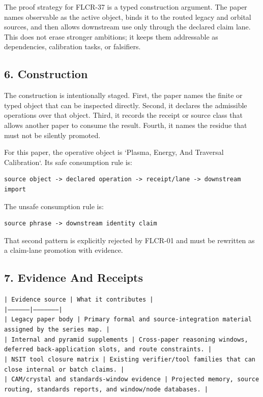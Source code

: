 \documentclass[11pt]{article}
\begin{document}
The proof strategy for FLCR-37 is a typed construction argument. The paper names observable as the active object, binds it to the routed legacy and orbital sources, and then allows downstream use only through the declared claim lane. This does not erase stronger ambitions; it keeps them addressable as dependencies, calibration tasks, or falsifiers.

\subsection*{6. Construction}

The construction is intentionally staged. First, the paper names the finite or
typed object that can be inspected directly. Second, it declares the admissible
operations over that object. Third, it records the receipt or source class that
allows another paper to consume the result. Fourth, it names the residue that
must not be silently promoted.

For this paper, the operative object is `Plasma, Energy, And Traversal Calibration`. Its safe consumption
rule is:

\begin{verbatim}
source object -> declared operation -> receipt/lane -> downstream import
\end{verbatim}

The unsafe consumption rule is:

\begin{verbatim}
source phrase -> downstream identity claim
\end{verbatim}

That second pattern is explicitly rejected by FLCR-01 and must be rewritten as
a claim-lane promotion with evidence.

\subsection*{7. Evidence And Receipts}

\noindent\texttt{| Evidence source | What it contributes |}\\
\noindent\texttt{|-----------------|---------------------|}\\
\noindent\texttt{| Legacy paper body | Primary formal and source-integration material assigned by the series map. |}\\
\noindent\texttt{| Internal and pyramid supplements | Cross-paper reasoning windows, deferred back-application slots, and route constraints. |}\\
\noindent\texttt{| NSIT tool closure matrix | Existing verifier/tool families that can close internal or batch claims. |}\\
\noindent\texttt{| CAM/crystal and standards-window evidence | Projected memory, source routing, standards reports, and window/node databases. |}\\
\end{document}
